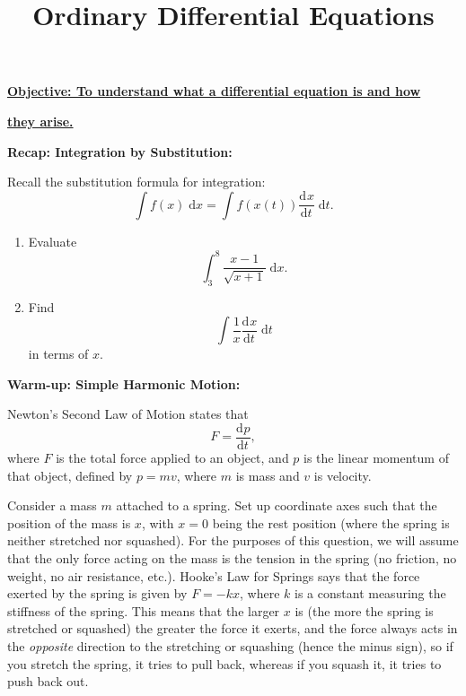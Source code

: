 \documentclass{article}
\newcommand{\deriv}[3][]{\frac{\mathrm{d}^{#1}#2}{\mathrm{d}#3^{#1}}}
\newcommand{\diff}{\;\mathrm{d}}
\begin{document}
\title{Ordinary Differential Equations}
\date{}

\maketitle
\thispagestyle{empty}

\Large

\textbf{\underline{Objective: To understand what a differential equation is and how}}

\textbf{\underline{they arise.}}







\vspace{5mm}



\textbf{Recap: Integration by Substitution:}


\bigskip


Recall the substitution formula for integration:
\[\int f(x)\diff x = \int f(x(t))\deriv{x}{t}\diff t.\]

\bigskip

\begin{enumerate}
	\item Evaluate
		\[\int_3^8 \frac{x-1}{\sqrt{x+1}}\diff x.\]
	\item Find
		\[\int \frac{1}{x}\deriv{x}{t}\diff t\]
		in terms of $x$.
\end{enumerate}















\clearpage





\textbf{Warm-up: Simple Harmonic Motion:}\bigskip



Newton's Second Law of Motion states that
\[F=\deriv{p}{t},\]
where $F$ is the total force applied to an object, and $p$ is the linear momentum of that object, defined by $p=mv$, where $m$ is mass and $v$ is velocity.


Consider a mass $m$ attached to a spring. Set up coordinate axes such that the position of the mass is $x$, with $x=0$ being the rest position (where the spring is neither stretched nor squashed). For the purposes of this question, we will assume that the only force acting on the mass is the tension in the spring (no friction, no weight, no air resistance, etc.). Hooke's Law for Springs says that the force exerted by the spring is given by $F=-kx$, where $k$ is a constant measuring the stiffness of the spring. This means that the larger $x$ is (the more the spring is stretched or squashed) the greater the force it exerts, and the force always acts in the \textit{opposite} direction to the stretching or squashing (hence the minus sign), so if you stretch the spring, it tries to pull back, whereas if you squash it, it tries to push back out.
\end{document}
